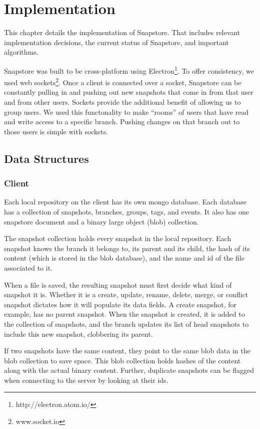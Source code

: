 \chapter{Implementation}

This chapter details the implementation of Snapstore. That includes relevant implementation decisions, the current status of Snapstore, and important algorithms. 

Snapstore was built to be cross-platform using Electron\footnote{http://electron.atom.io/}. To offer consistency, we used web sockets\footnote{www.socket.io}. Once a client is connected over a socket, Snapstore can be constantly pulling in and pushing out new snapshots that come in from that user and from other users. Sockets provide the additional benefit of allowing us to group users. We used this functonality to make ``rooms'' of users that have read and write access to a specific branch. Pushing changes on that branch out to those users is simple with sockets.

\section{Data Structures}

\subsection{Client}

Each local repository on the client has its own mongo database. Each database has a collection of snapshots, branches, groups, tags, and events. It also has one snapstore document and a binary large object (blob) collection.

The snapshot collection holds every snapshot in the local repository. Each snapshot knows the branch it belongs to, its parent and its child, the hash of its content (which is stored in the blob database), and the name and id of the file associated to it.

When a file is saved, the resulting snapshot must first decide what kind of snapshot it is. Whether it is a create, update, rename, delete, merge, or conflict snapshot dictates how it will populate its data fields. A create snapshot, for example, has no parent snapshot. When the snapshot is created, it is added to the collection of snapshots, and the branch updates its list of head snapshots to include this new snapshot, clobbering its parent.

If two snapshots have the same content, they point to the same blob data in the blob collection to save space. This blob collection holds hashes of the content along with the actual binary content. Further, duplicate snapshots can be flagged when connecting to the server by looking at their ids.

